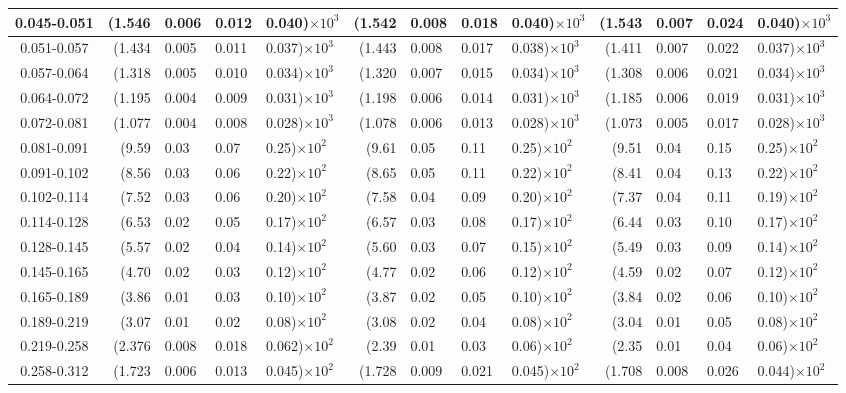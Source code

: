 \begin{table}[!htbp]
{\begin{tabular}{ | c | r@{$\pm$}l@{$\pm$}l@{$\pm$}l | r@{$\pm$}l@{$\pm$}l@{$\pm$}l | r@{$\pm$}l@{$\pm$}l@{$\pm$}l |}
0.045-0.051 & (1.546&0.006&0.012&0.040)$\times 10^{3}$ & (1.542&0.008&0.018&0.040)$\times 10^{3}$ & (1.543&0.007&0.024&0.040)$\times 10^{3}$ \\ \hline
0.051-0.057 & (1.434&0.005&0.011&0.037)$\times 10^{3}$ & (1.443&0.008&0.017&0.038)$\times 10^{3}$ & (1.411&0.007&0.022&0.037)$\times 10^{3}$ \\ \hline
0.057-0.064 & (1.318&0.005&0.010&0.034)$\times 10^{3}$ & (1.320&0.007&0.015&0.034)$\times 10^{3}$ & (1.308&0.006&0.021&0.034)$\times 10^{3}$ \\ \hline
0.064-0.072 & (1.195&0.004&0.009&0.031)$\times 10^{3}$ & (1.198&0.006&0.014&0.031)$\times 10^{3}$ & (1.185&0.006&0.019&0.031)$\times 10^{3}$ \\ \hline
0.072-0.081 & (1.077&0.004&0.008&0.028)$\times 10^{3}$ & (1.078&0.006&0.013&0.028)$\times 10^{3}$ & (1.073&0.005&0.017&0.028)$\times 10^{3}$ \\ \hline
0.081-0.091 & (9.59&0.03&0.07&0.25)$\times 10^{2}$ & (9.61&0.05&0.11&0.25)$\times 10^{2}$ & (9.51&0.04&0.15&0.25)$\times 10^{2}$ \\ \hline
0.091-0.102 & (8.56&0.03&0.06&0.22)$\times 10^{2}$ & (8.65&0.05&0.11&0.22)$\times 10^{2}$ & (8.41&0.04&0.13&0.22)$\times 10^{2}$ \\ \hline
0.102-0.114 & (7.52&0.03&0.06&0.20)$\times 10^{2}$ & (7.58&0.04&0.09&0.20)$\times 10^{2}$ & (7.37&0.04&0.11&0.19)$\times 10^{2}$ \\ \hline
0.114-0.128 & (6.53&0.02&0.05&0.17)$\times 10^{2}$ & (6.57&0.03&0.08&0.17)$\times 10^{2}$ & (6.44&0.03&0.10&0.17)$\times 10^{2}$ \\ \hline
0.128-0.145 & (5.57&0.02&0.04&0.14)$\times 10^{2}$ & (5.60&0.03&0.07&0.15)$\times 10^{2}$ & (5.49&0.03&0.09&0.14)$\times 10^{2}$ \\ \hline
0.145-0.165 & (4.70&0.02&0.03&0.12)$\times 10^{2}$ & (4.77&0.02&0.06&0.12)$\times 10^{2}$ & (4.59&0.02&0.07&0.12)$\times 10^{2}$ \\ \hline
0.165-0.189 & (3.86&0.01&0.03&0.10)$\times 10^{2}$ & (3.87&0.02&0.05&0.10)$\times 10^{2}$ & (3.84&0.02&0.06&0.10)$\times 10^{2}$ \\ \hline
0.189-0.219 & (3.07&0.01&0.02&0.08)$\times 10^{2}$ & (3.08&0.02&0.04&0.08)$\times 10^{2}$ & (3.04&0.01&0.05&0.08)$\times 10^{2}$ \\ \hline
0.219-0.258 & (2.376&0.008&0.018&0.062)$\times 10^{2}$ & (2.39&0.01&0.03&0.06)$\times 10^{2}$ & (2.35&0.01&0.04&0.06)$\times 10^{2}$ \\ \hline
0.258-0.312 & (1.723&0.006&0.013&0.045)$\times 10^{2}$ & (1.728&0.009&0.021&0.045)$\times 10^{2}$ & (1.708&0.008&0.026&0.044)$\times 10^{2}$ \\ \hline

\end{tabular}}
\end{table}
